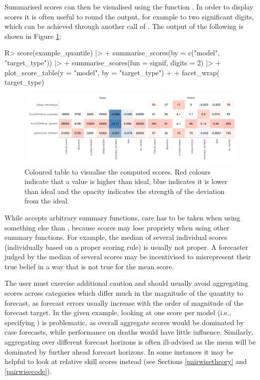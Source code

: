 \documentclass[
]{jss}
\begin{document}
Summarised scores can then be visualised using the function
. In order to display scores it is often useful to
round the output, for example to two significant digits, which can be
achieved through another call of . The output
of the following is shown in Figure \ref{fig:score-table}:

\begin{CodeChunk}
\begin{CodeInput}
R> score(example_quantile) |>
+   summarise_scores(by = c("model", "target_type")) |>
+   summarise_scores(fun = signif, digits = 2) |>
+   plot_score_table(y = "model", by = "target_type") +
+   facet_wrap(~ target_type)
\end{CodeInput}
\begin{figure}

{\centering \includegraphics[width=1\linewidth]{manuscript_files/figure-latex/score-table-1}

}

\caption[Coloured table to visualise the computed scores]{Coloured table to visualise the computed scores. Red colours indicate that a value is higher than ideal, blue indicates it is lower than ideal and the opacity indicates the strength of the deviation from the ideal.}\label{fig:score-table}
\end{figure}
\end{CodeChunk}

While  accepts arbitrary summary functions,
care has to be taken when using something else than ,
because scores may lose propriety when using other summary functions.
For example, the median of several individual scores (individually based
on a proper scoring rule) is usually not proper. A forecaster judged by
the median of several scores may be incentivised to misrepresent their
true belief in a way that is not true for the mean score.

The user must exercise additional caution and should usually avoid
aggregating scores across categories which differ much in the magnitude
of the quantity to forecast, as forecast errors usually increase with
the order of magnitude of the forecast target. In the given example,
looking at one score per model (i.e., specifying
) is problematic, as overall aggregate
scores would be dominated by case forecasts, while performance on deaths
would have little influence. Similarly, aggregating over different
forecast horizons is often ill-advised as the mean will be dominated by
further ahead forecast horizons. In some instances it may be helpful to
look at relative skill scores instead (see Sections \ref{pairwisetheory}
and \ref{pairwisecode}).
\end{document}
